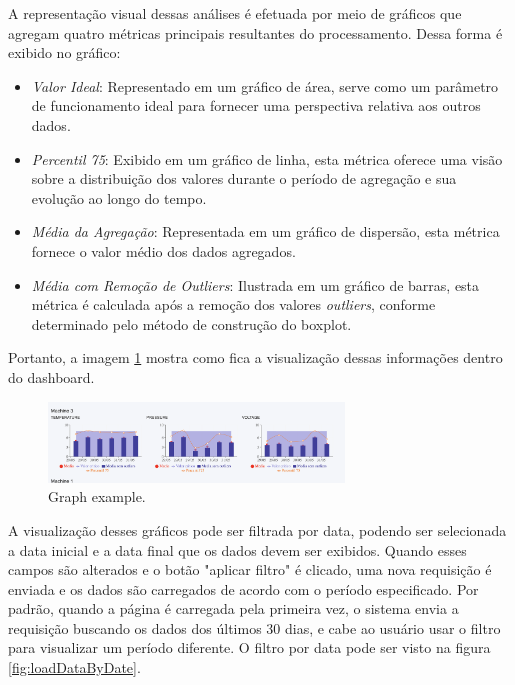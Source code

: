 A representação visual dessas análises é efetuada por meio de gráficos que agregam quatro métricas principais resultantes do processamento. Dessa forma é exibido no gráfico:

\begin{itemize}
    \item \textit{Valor Ideal}: Representado em um gráfico de área, serve como um parâmetro de funcionamento ideal para fornecer uma perspectiva relativa aos outros dados.
    \item \textit{Percentil 75}: Exibido em um gráfico de linha, esta métrica oferece uma visão sobre a distribuição dos valores durante o período de agregação e sua evolução ao longo do tempo.
    \item \textit{Média da Agregação}: Representada em um gráfico de dispersão, esta métrica fornece o valor médio dos dados agregados.
    \item \textit{Média com Remoção de \textit{Outliers}}: Ilustrada em um gráfico de barras, esta métrica é calculada após a remoção dos valores \textit{outliers}, conforme determinado pelo método de construção do boxplot.
\end{itemize}

Portanto, a imagem \ref{fig:graphData} mostra como fica a visualização dessas informações dentro do dashboard.

\begin{figure}[htbp]
	\centering
	\includegraphics[width=0.7\textwidth]{images/graphData.png}
	\caption{Graph example.}
	\label{fig:graphData}
\end{figure}


A visualização desses gráficos pode ser filtrada por data, podendo ser selecionada a data inicial e a data final que os dados devem ser exibidos. Quando esses campos são alterados e o botão "aplicar filtro" é clicado, uma nova requisição é enviada e os dados são carregados de acordo com o período especificado. Por padrão, quando a página é carregada pela primeira vez, o sistema envia a requisição buscando os dados dos últimos 30 dias, e cabe ao usuário usar o filtro para visualizar um período diferente. O filtro por data pode ser visto na figura \ref{fig:loadDataByDate}.

